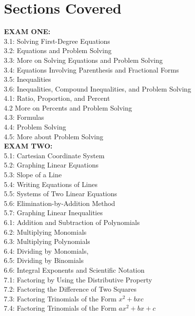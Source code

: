 \documentclass[11pt]{article}
\begin{document}
\newpage

\section*{Sections Covered}
\textbf{EXAM ONE:} \\
3.1: Solving First-Degree Equations \\
3.2: Equations and Problem Solving \\
3.3: More on Solving Equations and Problem Solving \\
3.4: Equations Involving Parenthesis and Fractional Forms \\
3.5: Inequalities \\
3.6: Inequalities, Compound Inequalities, and Problem Solving \\
4.1: Ratio, Proportion, and Percent \\
4.2 More on Percents and Problem Solving \\
4.3: Formulas \\
4.4: Problem Solving \\
4.5: More about Problem Solving \\
\textbf{EXAM TWO:} \\
5.1: Cartesian Coordinate System \\
5.2: Graphing Linear Equations \\
5.3: Slope of a Line \\
5.4: Writing Equations of Lines \\
5.5: Systems of Two Linear Equations \\
5.6: Elimination-by-Addition Method \\
5.7: Graphing Linear Inequalities \\
6.1: Addition and Subtraction of Polynomials \\
6.2: Multiplying Monomials \\
6.3: Multiplying Polynomials \\
6.4: Dividing by Monomials, \\
6.5: Dividing by Binomials \\
6.6: Integral Exponents and Scientific Notation \\
7.1: Factoring by Using the Distributive Property \\
7.2: Factoring the Difference of Two Squares \\
7.3: Factoring Trinomials of the Form $x^2 + bxc$ \\
7.4: Factoring Trinomials of the Form $ax^2 + bx + c$ \\
\end{document}

